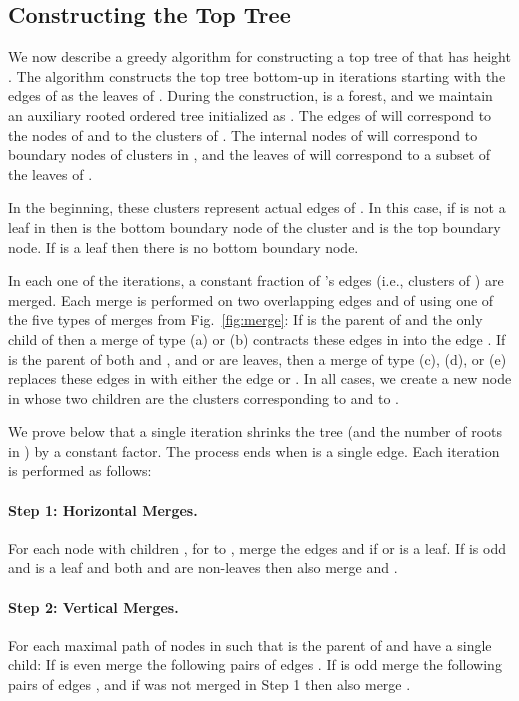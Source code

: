 \documentclass [11pt]{article}
\begin{document}
\subsection{Constructing the Top Tree}\label{sec:toptreeconstruction}


We now describe a greedy algorithm for constructing a top tree  of  that has height . The algorithm constructs the top tree  bottom-up in  iterations starting with the edges of  as the leaves of . 
During the construction,  is a forest, and we maintain an auxiliary rooted ordered tree  initialized as . The edges of  will correspond to the nodes of  and to the clusters of . 
The internal nodes of  will correspond to boundary nodes of clusters in , and the leaves of    will correspond to a subset of the leaves of .

In the beginning, these clusters represent actual edges  of . In this case, if  is not a leaf in  then  is the bottom boundary node of the cluster and  is the top boundary node. If  is a leaf then there is no bottom boundary node. 

In each one of the  iterations, a constant fraction of 's edges (i.e., clusters of ) are merged. 
Each merge is performed on two overlapping edges  and  of  using one of the five types of merges from Fig.~\ref{fig:merge}: If  is the parent of  and the only child of  then a merge of type (a) or (b) contracts these edges in  into the edge . If  is the parent of both  and , and  or  are  leaves, then a merge of type (c), (d), or (e) replaces these edges in  with either the edge  or . In all cases, we create a new node in  whose two children are the clusters corresponding to  and to . 

We prove below that a single iteration shrinks the tree  (and the number of roots in ) by a constant factor. The process ends when  is a single edge. Each iteration is performed as follows:

\paragraph{Step 1: Horizontal Merges.} For each node  with  children , for  to ,
merge the edges  and   if  or  is a leaf.
If  is odd  and  is a leaf and both  and  are non-leaves then also merge  and .

\paragraph{Step 2: Vertical Merges.} For each maximal path  of nodes in  such that  is the parent of  and  have a single child: If  is even merge the following pairs of  edges . If  is odd  merge the following pairs of  edges 
, and if  was not merged in Step 1 then also merge .
\end{document}
